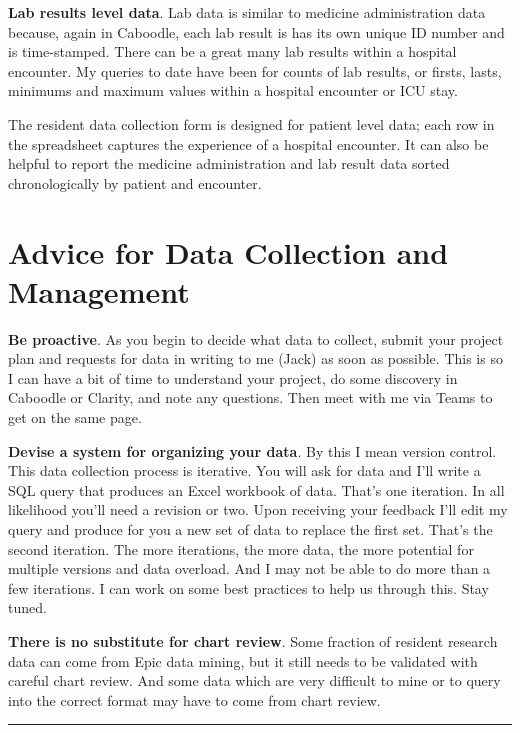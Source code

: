 \documentclass[
]{report}
\begin{document}
\textbf{Lab results level data}. Lab data is similar to medicine
administration data because, again in Caboodle, each lab result is has
its own unique ID number and is time-stamped. There can be a great many
lab results within a hospital encounter. My queries to date have been
for counts of lab results, or firsts, lasts, minimums and maximum values
within a hospital encounter or ICU stay.

The resident data collection form is designed for patient level data;
each row in the spreadsheet captures the experience of a hospital
encounter. It can also be helpful to report the medicine administration
and lab result data sorted chronologically by patient and encounter.

\hypertarget{advice-for-data-collection-and-management}{%
\section{Advice for Data Collection and
Management}\label{advice-for-data-collection-and-management}}

\textbf{Be proactive}. As you begin to decide what data to collect,
submit your project plan and requests for data in writing to me (Jack)
as soon as possible. This is so I can have a bit of time to understand
your project, do some discovery in Caboodle or Clarity, and note any
questions. Then meet with me via Teams to get on the same page.

\textbf{Devise a system for organizing your data}. By this I mean
version control. This data collection process is iterative. You will ask
for data and I'll write a SQL query that produces an Excel workbook of
data. That's one iteration. In all likelihood you'll need a revision or
two. Upon receiving your feedback I'll edit my query and produce for you
a new set of data to replace the first set. That's the second iteration.
The more iterations, the more data, the more potential for multiple
versions and data overload. And I may not be able to do more than a few
iterations. I can work on some best practices to help us through this.
Stay tuned.

\textbf{There is no substitute for chart review}. Some fraction of
resident research data can come from Epic data mining, but it still
needs to be validated with careful chart review. And some data which are
very difficult to mine or to query into the correct format may have to
come from chart review.

\begin{center}\rule{0.5\linewidth}{0.5pt}\end{center}
\end{document}
